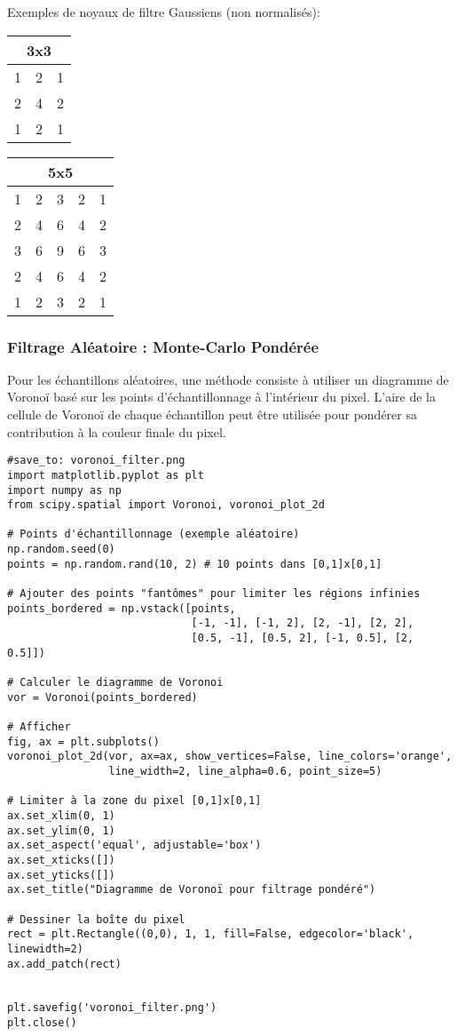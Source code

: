 \documentclass{article}
\begin{document}
Exemples de noyaux de filtre Gaussiens (non normalisés):
\begin{center}
\begin{tabular}{ccc}
\multicolumn{3}{c}{3x3} \\ \hline
1 & 2 & 1 \\
2 & 4 & 2 \\
1 & 2 & 1 \\ \hline
\end{tabular}
\qquad
\begin{tabular}{ccccc}
\multicolumn{5}{c}{5x5} \\ \hline
1 & 2 & 3 & 2 & 1 \\
2 & 4 & 6 & 4 & 2 \\
3 & 6 & 9 & 6 & 3 \\
2 & 4 & 6 & 4 & 2 \\
1 & 2 & 3 & 2 & 1 \\ \hline
\end{tabular}
\end{center}

\subsubsection{Filtrage Aléatoire : Monte-Carlo Pondérée}
Pour les échantillons aléatoires, une méthode consiste à utiliser un diagramme de Voronoï basé sur les points d'échantillonnage à l'intérieur du pixel. L'aire de la cellule de Voronoï de chaque échantillon peut être utilisée pour pondérer sa contribution à la couleur finale du pixel.

\begin{verbatim}
#save_to: voronoi_filter.png
import matplotlib.pyplot as plt
import numpy as np
from scipy.spatial import Voronoi, voronoi_plot_2d

# Points d'échantillonnage (exemple aléatoire)
np.random.seed(0)
points = np.random.rand(10, 2) # 10 points dans [0,1]x[0,1]

# Ajouter des points "fantômes" pour limiter les régions infinies
points_bordered = np.vstack([points,
                             [-1, -1], [-1, 2], [2, -1], [2, 2],
                             [0.5, -1], [0.5, 2], [-1, 0.5], [2, 0.5]])

# Calculer le diagramme de Voronoi
vor = Voronoi(points_bordered)

# Afficher
fig, ax = plt.subplots()
voronoi_plot_2d(vor, ax=ax, show_vertices=False, line_colors='orange',
                line_width=2, line_alpha=0.6, point_size=5)

# Limiter à la zone du pixel [0,1]x[0,1]
ax.set_xlim(0, 1)
ax.set_ylim(0, 1)
ax.set_aspect('equal', adjustable='box')
ax.set_xticks([])
ax.set_yticks([])
ax.set_title("Diagramme de Voronoï pour filtrage pondéré")

# Dessiner la boîte du pixel
rect = plt.Rectangle((0,0), 1, 1, fill=False, edgecolor='black', linewidth=2)
ax.add_patch(rect)


plt.savefig('voronoi_filter.png')
plt.close()
\end{verbatim}
\end{document}
